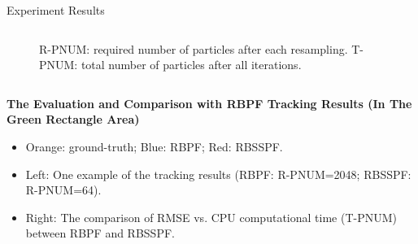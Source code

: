 \documentclass[final,hyperref={pdfpagelabels=false}]{beamer}
\begin{document}
\begin{frame}[t]
\begin{columns}[t]
\begin{column}{.48\textwidth}
\begin{block}{Experiment Results}
\begin{columns}[t]
\begin{column}{0.48\textwidth}
\begin{figure}
		 \caption{R-PNUM: required number of particles after each resampling. T-PNUM: total number of particles after all iterations. \label{fig:SSPF-Iteration}}
		\end{figure}
	\end{column}
\end{columns}
\vspace{1em}
\begin{center}
\textbf{The Evaluation and Comparison with RBPF Tracking Results (In The Green Rectangle Area)}
\end{center}
\begin{itemize}
\small
\item Orange: ground-truth; Blue: RBPF; Red: RBSSPF.
\item Left: One example of the tracking results (RBPF: R-PNUM=2048; RBSSPF: R-PNUM=64).
\item Right: The comparison of RMSE vs. CPU computational time (T-PNUM) between RBPF and RBSSPF.
\end{itemize}
\begin{columns}[t]
\begin{column}{0.18\textwidth}
\begin{figure}
 \centering

\end{figure}
\end{column}
\end{columns}
\end{block}
\end{column}
\end{columns}
\end{frame}
\end{document}
